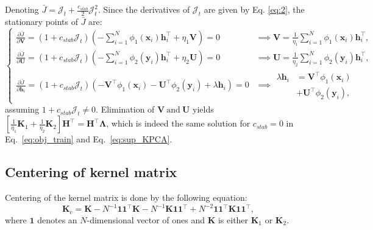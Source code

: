 \documentclass[preview,border=0.3pt]{standalone}
\begin{document}
%
Denoting $ \bar{J} = \mathcal{J}_{t} + \frac{c_{stab}}{2}\mathcal{J}_{t}^2 $. Since the derivatives of $ \mathcal{J}_{t} $ are given by Eq. \ref{eq:2}, the stationary points of $ \bar{J} $ are:
\[
    \begin{cases}
        \frac{\partial \bar{J}}{\partial \bm{V}} = \left(1 + c_{stab}\mathcal{J}_{t} \right)\left( - \sum_{i=1}^{N}\phi_{1}(\bm{x}_{i})\bm{h}_{i}^\top + \eta_{1}\bm{V}\right) = 0                       & \implies {\bm{V} = \frac{1}{\eta_{1}} \sum_{i=1}^{N}\phi_{1}(\bm{x}_{i})\bm{h}_{i}^\top }, \\
        \frac{\partial \bar{J}}{\partial \bm{U}} = \left(1 + c_{stab}\mathcal{J}_{t} \right)\left( - \sum_{i=1}^{N}\phi_{2}(\bm{y}_{i})\bm{h}_{i}^\top + \eta_{2}\bm{U}\right) = 0                       & \implies {\bm{U} = \frac{1}{\eta_{2}} \sum_{i=1}^{N}\phi_{2}(\bm{y}_{i})\bm{h}_{i}^\top }, \\
        \frac{\partial \bar{J}}{\partial \bm{h}_{i}} = \left(1 + c_{stab}\mathcal{J}_{t} \right)\left( -  \bm{V}^\top \phi_{1}(\bm{x}_i) - \bm{U}^\top \phi_{2}(\bm{y}_i) + \lambda \bm{h}_i \right) = 0 & \implies \begin{aligned}\lambda \bm{h}_i & =  \bm{V}^\top \phi_{1}(\bm{x}_i) \\ &+ \bm{U}^\top \phi_{2}(\bm{y}_i),
        \end{aligned}
    \end{cases}
\]
assuming $ 1 + c_{stab}\mathcal{J}_{t} \neq 0 $. Elimination of $ \bm{V} ~ \text{and} ~ \bm{U} $ yields $     {\left[ \frac{1}{\eta_{1}}\bm{K}_{1} + \frac{1}{\eta_{2}}\bm{K}_{2} \right] \bm{H}^\top=\bm{H}^\top \bm{\Lambda}} $, which is indeed the same solution for $ c_{stab}=0 $ in Eq.~\ref{eq:obj_train} and Eq.~\ref{eq:sup_KPCA}.
%
\subsection{Centering of kernel matrix \label{sec:centering}}
%
Centering of the kernel matrix is done by the following equation:
\begin{equation}\label{eq:centering}
    \bm{K}_{c}= \bm{K} - N^{-1}\bm{11}^{\top} \bm{K} - N^{-1}\bm{K} \bm{11}^{\top} + N^{-2}\bm{11}^{\top}\bm{K}\bm{11}^{\top},
\end{equation}
where $\bm 1$ denotes an $N$-dimensional vector of ones and $ \bm{K} $ is either $ \bm{K}_{1} $ or $ \bm{K}_{2} $.
%
%
\end{document}

